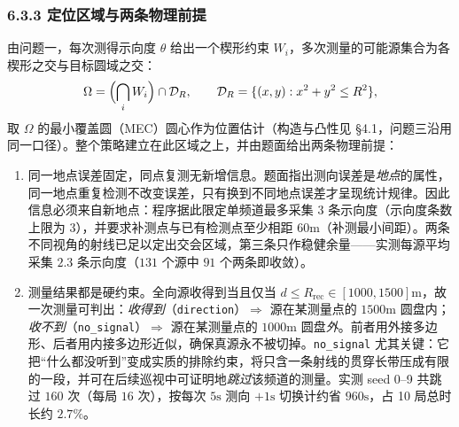 \documentclass[UTF8, zihao=5,AutoFakeBold=2]{ctexart}
\begin{document}
\subsubsection*{6.3.3 定位区域与两条物理前提}

由问题一，每次测得示向度 \(\theta\) 给出一个楔形约束 \(W_i\)，多次测量的可能源集合为各楔形之交与目标圆域之交：
\begin{equation}
    \Omega=\Bigl(\bigcap_{i} W_i\Bigr)\cap \mathcal{D}_R,\qquad
    \mathcal{D}_R=\{(x,y):x^2+y^2\le R^2\},
\end{equation}
取 \(\Omega\) 的最小覆盖圆（MEC）圆心作为位置估计（构造与凸性见 \S4.1，问题三沿用同一口径）。整个策略建立在此区域之上，并由题面给出两条物理前提：

\begin{enumerate}
    \item 同一地点误差固定，同点复测无新增信息。题面指出测向误差是\emph{地点}的属性，同一地点重复检测不改变误差，只有换到不同地点误差才呈现统计规律。因此信息必须来自新地点：程序据此限定单频道最多采集 \(3\) 条示向度（示向度条数上限为 \(3\)），并要求补测点与已有检测点至少相距 \(60\text{m}\)（补测最小间距）。两条不同视角的射线已足以定出交会区域，第三条只作稳健余量——实测每源平均采集 \(2.3\) 条示向度（\(131\) 个源中 \(91\) 个两条即收敛）。
    \item 测量结果都是硬约束。全向源收得到当且仅当 \(d\le R_{\text{rec}}\in[1000,1500]\text{m}\)，故一次测量可判出：\emph{收得到}（\texttt{direction}）\(\Rightarrow\) 源在某测量点的 \(1500\text{m}\) 圆盘内；\emph{收不到}（\texttt{no\_signal}）\(\Rightarrow\) 源在某测量点的 \(1000\text{m}\) 圆盘\emph{外}。前者用外接多边形、后者用内接多边形近似，确保真源永不被切掉。\texttt{no\_signal} 尤其关键：它把“什么都没听到”变成实质的排除约束，将只含一条射线的贯穿长带压成有限的一段，并可在后续巡视中可证明地\emph{跳过}该频道的测量。实测 seed 0--9 共跳过 \(160\) 次（每局 \(16\) 次），按每次 \(5\text{s}\) 测向 \(+1\text{s}\) 切换计约省 \(960\text{s}\)，占 10 局总时长约 \(2.7\%\)。
\end{enumerate}
\end{document}

